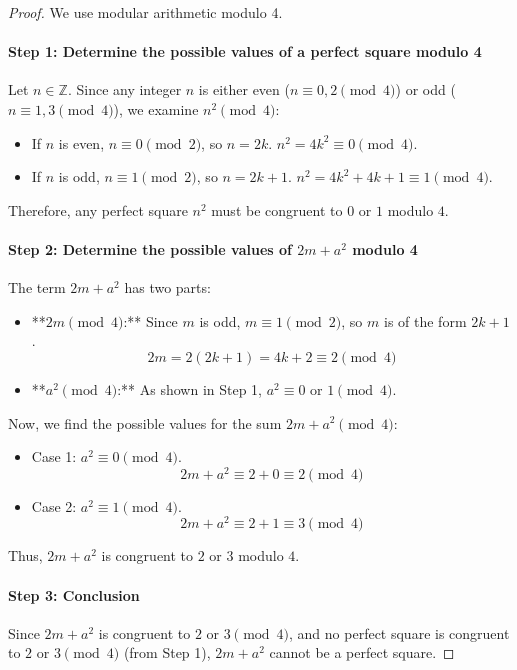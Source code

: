 \begin{proof}
We use modular arithmetic modulo 4.

\paragraph{Step 1: Determine the possible values of a perfect square modulo 4}
Let $n \in \mathbb{Z}$. Since any integer $n$ is either even ($n \equiv 0, 2 \pmod{4}$) or odd ($n \equiv 1, 3 \pmod{4}$), we examine $n^2 \pmod{4}$:
\begin{itemize}
    \item If $n$ is even, $n \equiv 0 \pmod{2}$, so $n=2k$. $n^2 = 4k^2 \equiv 0 \pmod{4}$.
    \item If $n$ is odd, $n \equiv 1 \pmod{2}$, so $n=2k+1$. $n^2 = 4k^2 + 4k + 1 \equiv 1 \pmod{4}$.
\end{itemize}
Therefore, any perfect square $n^2$ must be congruent to $0$ or $1$ modulo $4$.

\paragraph{Step 2: Determine the possible values of $2m+a^2$ modulo 4}
The term $2m+a^2$ has two parts:
\begin{itemize}
    \item **$2m \pmod{4}$:** Since $m$ is odd, $m \equiv 1 \pmod{2}$, so $m$ is of the form $2k+1$.
    $$ 2m = 2(2k+1) = 4k + 2 \equiv 2 \pmod{4} $$
    \item **$a^2 \pmod{4}$:** As shown in Step 1, $a^2 \equiv 0$ or $1 \pmod{4}$.
\end{itemize}
Now, we find the possible values for the sum $2m+a^2 \pmod{4}$:
\begin{itemize}
    \item Case 1: $a^2 \equiv 0 \pmod{4}$.
    $$ 2m+a^2 \equiv 2 + 0 \equiv 2 \pmod{4} $$
    \item Case 2: $a^2 \equiv 1 \pmod{4}$.
    $$ 2m+a^2 \equiv 2 + 1 \equiv 3 \pmod{4} $$
\end{itemize}
Thus, $2m+a^2$ is congruent to $2$ or $3$ modulo $4$.

\paragraph{Step 3: Conclusion}
Since $2m+a^2$ is congruent to $2$ or $3 \pmod{4}$, and no perfect square is congruent to $2$ or $3 \pmod{4}$ (from Step 1), $2m+a^2$ cannot be a perfect square.
\end{proof}

